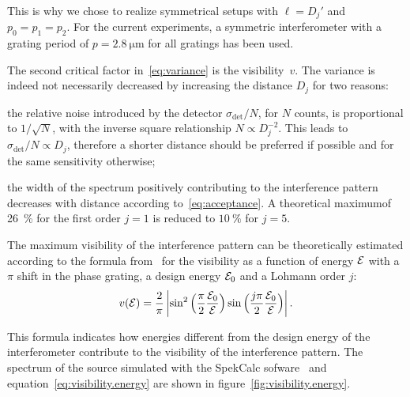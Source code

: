 This is why we chose to realize symmetrical setups with $\ell = D_j'$ and
$p_0 = p_1 = p_2$. For the current experiments, a symmetric interferometer
with a grating period of $p = \SI{2.8}{\micro\metre}$ for all gratings has
been used.

The second critical factor in~\eqref{eq:variance} is the visibility~$v$. The
variance is indeed not necessarily decreased by increasing the distance
$D_j$ for two reasons:
\begin{aenumerate}
    \item the relative noise introduced by the detector
        $\sigma_{\text{det}}/N$, for
        $N$ counts, is proportional to $1 / \sqrt{N}$, with the inverse
        square relationship $N \propto
        D_j^{-2}$. This leads to $\sigma_{\text{det}}/N \propto D_j$,
        therefore a shorter distance should be preferred if possible and for
        the same sensitivity otherwise;
    \item the width of the spectrum positively contributing to the
        interference pattern decreases with distance according
        to~\eqref{eq:acceptance}. A theoretical maximum\cn of
        \SI{26}{\percent} for the first order $j = 1$ is reduced to
        $\SI{10}{\percent}$ for $j = 5$.
\end{aenumerate}
The maximum visibility of the interference pattern can be theoretically
estimated according to the formula from~\parencite{Thuering20130027} for the visibility as a function
of energy $\mathcal{E}$ with a $\pi$ shift in the phase grating, a design energy
$\mathcal{E}_0$ and a Lohmann order $j$:
\begin{equation}
            v(\mathcal{E}) = \frac{2}{\pi} \left\lvert \sin^2
            \Big(\frac{\pi}{2}\frac{\mathcal{E}_0}{\mathcal{E}}\Big) 
            \sin
            \Big(\frac{j\pi}{2}\frac{\mathcal{E}_0}{\mathcal{E}}\Big) 
            \right\rvert.
    \label{eq:visibility.energy}
\end{equation}

This formula indicates how energies different from the design energy of the
interferometer contribute to the visibility of the interference pattern. The
spectrum of the source simulated with the SpekCalc sofware~\parencite{spekcalc}
and equation~\eqref{eq:visibility.energy} are shown in
figure~\ref{fig:visibility.energy}.


